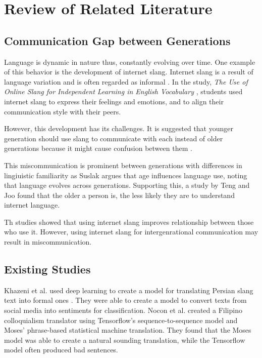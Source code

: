 \chapter{Review of Related Literature}
\label{sec:relatedlit}

\section{Communication Gap between Generations}
Language is dynamic in nature thus, constantly evolving over time. One example of this behavior is the development of internet slang. Internet slang is a result of language variation and is often regarded as informal \cite{Liu_Gui_Zuo_Dai_2019}. In the study, \textit{The Use of Online Slang for Independent Learning in English Vocabulary} \cite{Ambarsari_Amrullah_Nawawi_2020}, students used internet slang to express their feelings and emotions, and to align their communication style with their peers. 

However, this development has its challenges. It is suggested that younger generation should use slang to communicate with each instead of older generations because it might cause confusion between them \cite{Jeresano_Carretero_2022}.

This miscommunication is prominent between generations with differences in lingiuistic familiarity as Suslak \cite{SUSLAK2009199} argues that age influences language use, noting that language evolves across generations.
Supporting this, a study by Teng and Joo \cite{Teng_Joo2023} found that the older a person is, the less likely they are to understand internet language.

Th studies showed that using internet slang improves relationship between those who use it. However, using internet slang for intergenrational communication may result in miscommunication.


\section{Existing Studies}
Khazeni et al. used deep learning to create a model for translating Persian slang text into formal ones \cite{Khazeni}.
They were able to create a model to convert texts from social media into sentiments for classification.
Nocon et al. \cite{Nocon_Kho_Arroyo_2018} created a Filipino colloquialism translator using Tensorflow’s sequence-to-sequence model and Moses’ phrase-based statistical machine translation.
They found that the Moses model was able to create a natural sounding translation, while the Tensorflow model often produced bad sentences.

